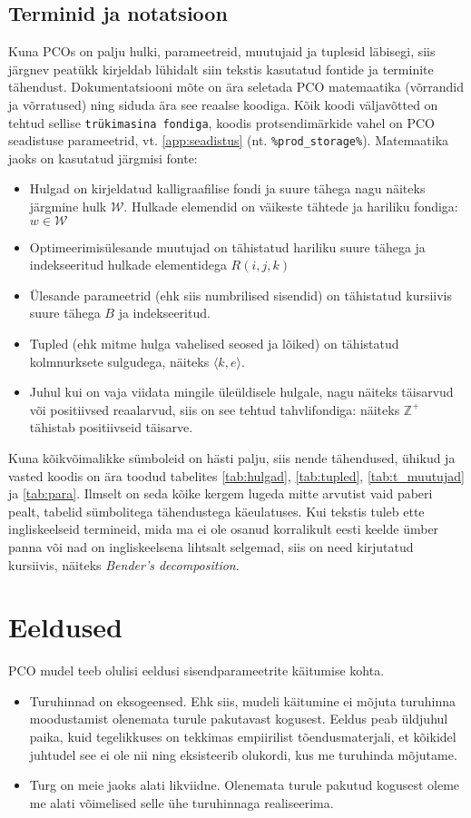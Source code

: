 \documentclass[10pt,a4paper]{article}
\begin{document}
\subsection{Terminid ja notatsioon}
\label{sec:terminid}
Kuna PCOs on palju hulki, parameetreid, muutujaid ja tuplesid läbisegi, siis  järgnev peatükk kirjeldab lühidalt siin tekstis kasutatud fontide ja terminite tähendust. Dokumentatsiooni mõte on ära seletada PCO matemaatika (võrran\-did ja võrratused) ning siduda ära see reaalse koodiga. Kõik koodi väljavõtted on tehtud sellise \texttt{trükimasina fondiga}, koodis protsendimärkide vahel on PCO seadistuse parameetrid, vt. \ref{app:seadistus} (nt. \texttt{\%prod\_storage\%}). Matemaatika jaoks on kasutatud järgmisi fonte:
\begin{itemize}
\item Hulgad on kirjeldatud kalligraafilise fondi ja suure tähega nagu näiteks järgmine hulk $\mathcal{W}$. Hulkade elemendid on väikeste tähtede ja hariliku fondiga: $w \in \mathcal{W}$
\item Optimeerimisülesande muutujad on tähistatud hariliku suure tähega ja indekseeritud hulkade elementidega $R(i,j,k)$
\item Ülesande parameetrid (ehk siis numbrilised sisendid) on tähistatud kursiivis suure tähega $\mathit{B}$ ja indekseeritud.
\item Tupled (ehk mitme hulga vahelised seosed ja lõiked) on tähistatud kolmnurksete sulgudega, näiteks $\langle k, e \rangle$.
\item Juhul kui on vaja viidata mingile üleüldisele hulgale, nagu näiteks täis\-arvud või positiivsed reaalarvud, siis on see tehtud tahvlifondiga: näiteks $\mathbb{Z}^+$ tähistab positiivseid täisarve.
\end{itemize}
Kuna kõikvõimalikke sümboleid on hästi palju, siis nende tähendused, ühikud ja vasted koodis on ära toodud tabelites \ref{tab:hulgad}, \ref{tab:tupled}, \ref{tab:t_muutujad} ja \ref{tab:para}. Ilmselt on seda kõike kergem lugeda mitte arvutist vaid paberi pealt, tabelid sümbolitega tähendustega käeulatuses.
Kui tekstis tuleb ette ingliskeelseid termineid, mida ma ei ole osanud korralikult eesti keelde ümber panna või nad on ingliskeelsena lihtsalt selgemad, siis on need kirjutatud kursiivis, näiteks \emph{Bender's decomposition}.

\section{Eeldused}
PCO mudel teeb olulisi eeldusi sisendparameetrite käitumise kohta. 
\begin{itemize}
\item Turuhinnad on eksogeensed. Ehk siis, mudeli käitumine ei mõjuta turuhinna moodustamist olenemata turule pakutavast kogusest. Eeldus peab üldjuhul paika, kuid tegelikkuses on tekkimas empiirilist tõendusmaterjali, et kõikidel juhtudel see ei ole nii ning eksisteerib olukordi, kus me turuhinda mõjutame.
\item Turg on meie jaoks alati likviidne. Olenemata turule pakutud kogusest oleme me alati võimelised selle ühe turuhinnaga realiseerima.
\end{itemize}
\end{document}
